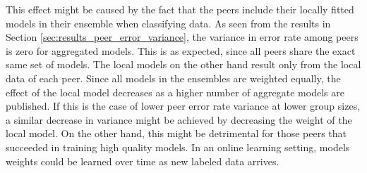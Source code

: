 This effect might be caused by the fact that the peers include their locally fitted models in their ensemble when classifying 
data. As seen from the results in  Section \ref{sec:results_peer_error_variance}, the variance in error rate among peers is zero for aggregated models. This is as expected, since all peers share the exact same set of models. The local models on the other hand result only from the local  data of each peer. Since all models in the ensembles are weighted equally, the effect of the local model decreases as a higher number of aggregate models are published. If this is the case of lower peer error rate variance at lower group sizes, a similar decrease in variance might be achieved by decreasing the weight of the local model. On the other hand, this might be detrimental for those peers that succeeded in training high quality models. In an online learning setting, models weights could be learned over time as new labeled data arrives.
